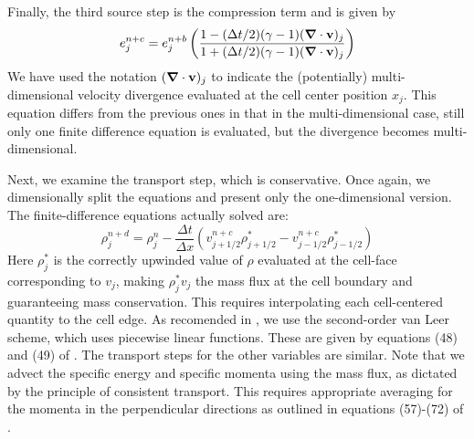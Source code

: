 Finally, the third source step is the compression term and is given by
\begin{equation}
e^{n+c}_j = e^{n+b}_j \left( \frac{1 - (\Delta t/2) (\gamma - 1) (\div \vecv)_j }
                           {1 + (\Delta t/2) (\gamma - 1) (\div \vecv)_j } \right)
\end{equation}
We have used the notation $(\bm{\nabla} \cdot \mathbf{v})_j$ to indicate the (potentially) multi-dimensional velocity divergence evaluated at the cell center position $x_j$.  This equation differs from the previous ones in that in the multi-dimensional case, still only one finite difference equation is evaluated, but the divergence becomes multi-dimensional.

Next, we examine the transport step, which is conservative.  Once again, we dimensionally split the equations and present only the one-dimensional version.  The finite-difference equations actually solved are:
\begin{equation}
\rho_j^{n+d} = \rho_j^{n} - \frac{\Delta t}{\Delta x} (v^{n+c}_{j+1/2} \rho^{*}_{j+1/2} - v^{n+c}_{j-1/2} \rho^{*}_{j-1/2} )
\end{equation}
Here $\rho^*_j$ is the correctly upwinded value of $\rho$ evaluated at the cell-face corresponding to $v_j$, making $\rho^*_j v_j$ the mass flux at the cell boundary and guaranteeing mass conservation.   This requires interpolating each cell-centered quantity to the cell edge.  As recomended in \citet{Stone92a}, we use the second-order van Leer scheme, which uses piecewise linear functions.  These are given by equations (48) and (49) of \citet{Stone92a}.  The transport steps for the other variables are similar.  Note that we advect the specific energy and specific momenta using the mass flux, as dictated by the principle of consistent transport.  This requires appropriate averaging for the momenta in the perpendicular directions as outlined in equations (57)-(72) of \citet{Stone92a}.


